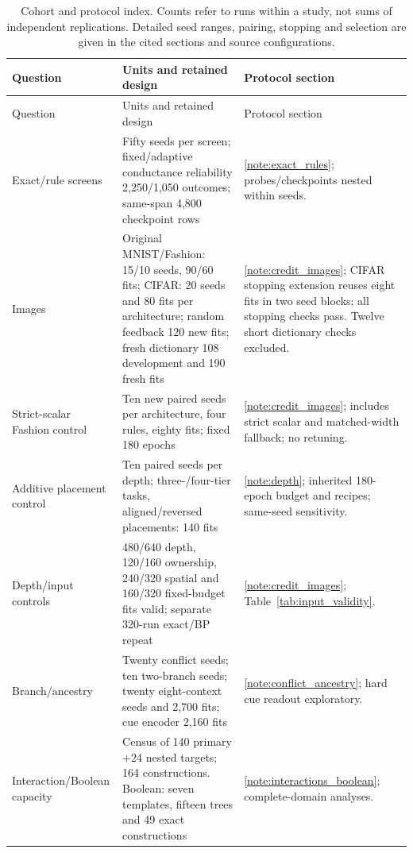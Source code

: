 \clearpage
{}
\begin{longtable}{p{}p{}p{}}
\caption{Cohort and protocol index. Counts refer to runs within a study, not sums of independent replications. Detailed seed ranges, pairing, stopping and selection are given in the cited sections and source configurations.}\label{tab:experiment_cohorts}\\
\toprule
Question & Units and retained design & Protocol section \\
\midrule
\endfirsthead
\toprule Question & Units and retained design & Protocol section \\
\midrule
\endhead
Exact/rule screens & Fifty seeds per screen; fixed/adaptive conductance reliability 2,250/1,050 outcomes; same-span 4,800 checkpoint rows & \ref{note:exact_rules}; probes/checkpoints nested within seeds. \\
Images & Original MNIST/Fashion: 15/10 seeds, 90/60 fits; CIFAR: 20 seeds and 80 fits per architecture; random feedback 120 new fits; fresh dictionary 108 development and 190 fresh fits & \ref{note:credit_images}; CIFAR stopping extension reuses eight fits in two seed blocks; all stopping checks pass. Twelve short dictionary checks excluded. \\
Strict-scalar Fashion control & Ten new paired seeds per architecture, four rules, eighty fits; fixed 180 epochs & \ref{note:credit_images}; includes strict scalar and matched-width fallback; no retuning. \\
Additive placement control & Ten paired seeds per depth; three-/four-tier tasks, aligned/reversed placements: 140 fits & \ref{note:depth}; inherited 180-epoch budget and recipes; same-seed sensitivity. \\
Depth/input controls & 480/640 depth, 120/160 ownership, 240/320 spatial and 160/320 fixed-budget fits valid; separate 320-run exact/BP repeat & \ref{note:credit_images}; Table~\ref{tab:input_validity}. \\
Branch/ancestry & Twenty conflict seeds; ten two-branch seeds; twenty eight-context seeds and 2,700 fits; cue encoder 2,160 fits & \ref{note:conflict_ancestry}; hard cue readout exploratory. \\
Interaction/Boolean capacity & Census of 140 primary +24 nested targets; 164 constructions. Boolean: seven templates, fifteen trees and 49 exact constructions & \ref{note:interactions_boolean}; complete-domain analyses. \\

\end{longtable}
